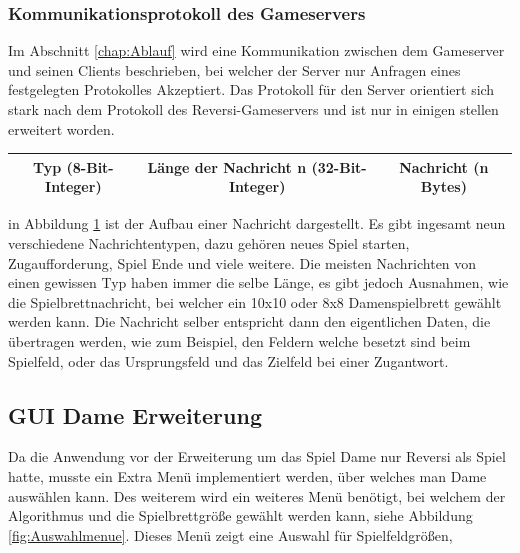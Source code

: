 \documentclass[12pt,a4paper,bibliography=totocnumbered,listof=totocnumbered]{article}
\begin{document}
\subsubsection{Kommunikationsprotokoll des Gameservers}
Im Abschnitt \ref{chap:Ablauf} wird eine Kommunikation zwischen dem Gameserver und seinen Clients beschrieben, bei welcher der 
Server nur Anfragen eines festgelegten Protokolles Akzeptiert. Das Protokoll für den Server orientiert sich stark nach dem Protokoll
des Reversi-Gameservers und ist nur in einigen stellen erweitert worden.
%
\begin{table}[H]
    \centering
    \begin{tabular} {|c|c|c|}
        \hline
        Typ (8-Bit-Integer) & Länge der Nachricht n (32-Bit-Integer) & Nachricht (n Bytes) \\
        \hline
    \end{tabular}
    \label{fig:Nachritenaufbau}
\end{table}

in Abbildung \ref{fig:Nachritenaufbau} ist der Aufbau einer Nachricht dargestellt. Es gibt ingesamt neun verschiedene Nachrichtentypen, dazu gehören 
neues Spiel starten, Zugaufforderung, Spiel Ende und viele weitere. Die meisten Nachrichten von einen gewissen Typ haben immer die selbe Länge, es gibt jedoch
Ausnahmen, wie die Spielbrettnachricht, bei welcher ein 10x10 oder 8x8 Damenspielbrett gewählt werden kann. Die Nachricht selber entspricht dann den eigentlichen 
Daten, die übertragen werden, wie zum Beispiel, den Feldern welche besetzt sind beim Spielfeld, oder das Ursprungsfeld und das Zielfeld bei einer Zugantwort. 

\subsection{GUI Dame Erweiterung}
Da die Anwendung vor der Erweiterung um das Spiel Dame nur Reversi als Spiel hatte, musste ein Extra Menü implementiert werden, über welches man Dame auswählen kann.
Des weiterem wird ein weiteres Menü benötigt, bei welchem der Algorithmus und die Spielbrettgröße gewählt werden kann, siehe Abbildung \ref{fig:Auswahlmenue}.
Dieses Menü zeigt eine Auswahl für Spielfeldgrößen, 
\end{document}
